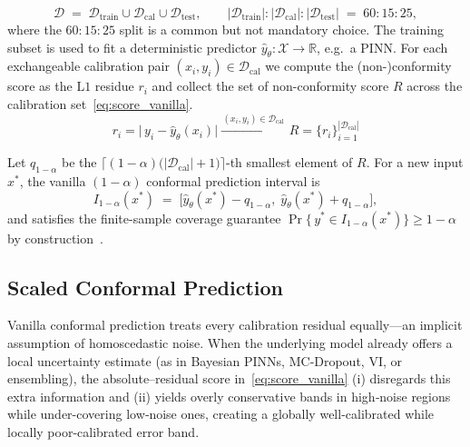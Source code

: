\documentclass[preprint,12pt]{elsarticle}
\begin{document}
\begin{equation}
  \mathcal D \;=\;
  \mathcal D_{\mathrm{train}} \cup
  \mathcal D_{\mathrm{cal}} \cup
  \mathcal D_{\mathrm{test}},
  \qquad
  |\mathcal D_{\mathrm{train}}|:|\mathcal D_{\mathrm{cal}}|:|\mathcal D_{\mathrm{test}}|
  \;=\; 60:15:25 ,
  \label{eq:data_split_vanilla}
\end{equation}
%
where the $60 : 15 : 25$ split is a common but not mandatory choice. The training subset is used to fit a deterministic predictor $\hat y_{\theta}\!:\mathcal X\!\to\!\mathbb R$, e.g.\ a PINN. For each exchangeable calibration pair $(x_i,y_i)\in\mathcal D_{\mathrm{cal}}$ we compute the (non-)conformity score as the $\mathrm{L}1$ residue $r_i$ and collect the set of non-conformity score $R$ across the calibration set~\eqref{eq:score_vanilla}.
%
\begin{equation}
  r_i = \bigl|\,y_i - \hat y_{\theta}(x_i)\bigr|
  \xrightarrow{\,(x_i,y_i)\in\mathcal D_{\mathrm{cal}}\,}
  R = \{r_i\}_{i=1}^{|\mathcal D_{\mathrm{cal}}|}
  \label{eq:score_vanilla}
\end{equation}
%

Let $q_{1-\alpha}$ be the
$\lceil (1-\alpha)\bigl(|\mathcal D_{\mathrm{cal}}|+1\bigr)\rceil$-th smallest element of $R$.  
For a new input $x^\ast$, the vanilla $(1-\alpha)$ conformal
prediction interval is
%
\begin{equation}
  I_{1-\alpha}(x^\ast)
  \;=\;
  \bigl[
      \hat y_{\theta}(x^\ast) - q_{1-\alpha},\;
      \hat y_{\theta}(x^\ast) + q_{1-\alpha}
  \bigr],
  \label{eq:vanilla_cp_interval}
\end{equation}
%
and satisfies the finite-sample coverage guarantee
$\Pr\!\bigl\{\,y^\ast\in I_{1-\alpha}(x^\ast)\bigr\}\ge 1-\alpha$ by construction~\cite{angelopoulos_gentle_2022}.

\bigskip
\subsection{Scaled Conformal Prediction}
\label{sec:sub:scaled_cp}

Vanilla conformal prediction treats every calibration residual equally—an implicit assumption of homoscedastic noise.
When the underlying model already offers a local uncertainty estimate (as in Bayesian PINNs, MC‐Dropout, VI, or ensembling), the absolute–residual score in~\eqref{eq:score_vanilla} (i) disregards this extra information and (ii) yields overly conservative bands in high‐noise regions while under-covering low‐noise ones, creating a globally well-calibrated while locally poor-calibrated error band.
\end{document}
